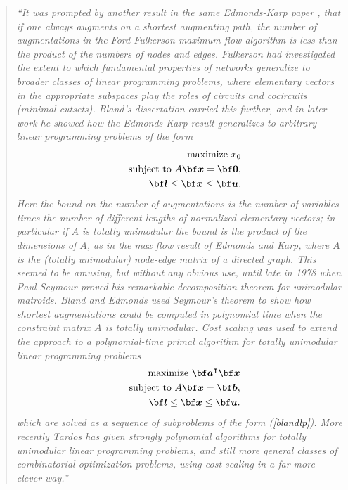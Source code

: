 \documentclass[moor]{informs1hack}              %
\def\ve#1{\mathchoice{\mbox{\boldmath$\displaystyle\bf#1$}}
{\mbox{\boldmath$\textstyle\bf#1$}}
{\mbox{\boldmath$\scriptstyle\bf#1$}}
{\mbox{\boldmath$\scriptscriptstyle\bf#1$}}}
\newcommand\vea{{\ve a}}
\newcommand\veb{{\ve b}}
\newcommand\vel{{\ve l}}
\newcommand\veu{{\ve u}}
\newcommand\vex{{\ve x}}
\newcommand{\T}{{\intercal}} %
\begin{document}
\begin{quotation}
\it
``It was prompted by another result in the same Edmonds-Karp paper \cite{edmondskarp}, that if one always augments on a shortest augmenting
path, the number of augmentations in the Ford-Fulkerson maximum flow algorithm
is less than the product of the numbers of nodes and edges. Fulkerson \cite{fulk}  had
investigated the extent to which fundamental properties of networks generalize to
broader classes of linear programming problems, where elementary vectors in the
appropriate subspaces play the roles of circuits and cocircuits (minimal cutsets).
Bland's dissertation \cite{blandthesis} carried this further, and in later work he showed how the
Edmonds-Karp result generalizes to arbitrary linear programming problems of the
form
{\rm
\begin{eqnarray}
&&\mbox{maximize }  x_0 \nonumber \\
&&\mbox{subject to } A\vex =\ve 0, \label{blandlp}\\
&&\vel\leq \vex \leq \veu. \nonumber
\end{eqnarray}
}
Here the bound on the number of augmentations is the number of variables times
the number of different lengths of normalized elementary vectors; in particular if
$A$ is totally unimodular the bound is the product of the dimensions of $A$, as in the
max flow result of Edmonds and Karp, where $A$ is the (totally unimodular) node-edge
matrix of a directed graph. This seemed to be amusing, but without any obvious
use, until late in 1978 when Paul Seymour \cite{seymour} proved his remarkable decomposition
theorem for unimodular matroids. Bland and Edmonds \cite{blandedmonds} used Seymour's theorem
to show how shortest augmentations could be computed in polynomial time when
the constraint matrix $A$ is totally unimodular. Cost scaling was used to extend the
approach to a polynomial-time primal algorithm for totally unimodular linear programming problems
{\rm
\begin{eqnarray*}
&&\mbox{maximize }  \vea^\T\vex  \\
&&\mbox{subject to } A\vex =\veb, \\
&&\vel\leq \vex \leq \veu.
\end{eqnarray*}
}
which are solved as a sequence of subproblems of the form (\ref{blandlp}). More recently
Tardos \cite{Tardos} has given strongly polynomial algorithms for totally unimodular linear
programming problems, and still more general classes of combinatorial optimization
problems, using cost scaling in a far more clever way.''
\end{quotation}
\end{document}
